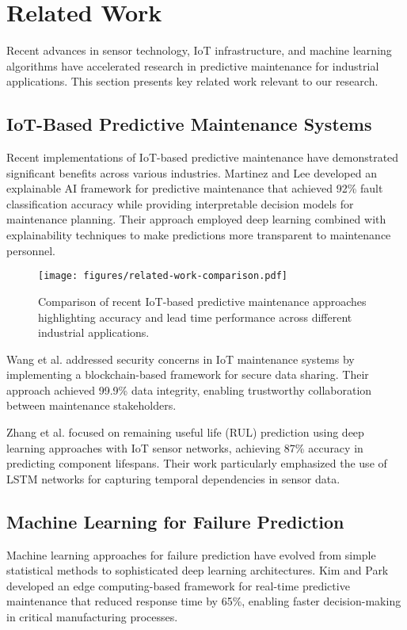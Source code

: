 \section{Related Work}
Recent advances in sensor technology, IoT infrastructure, and machine learning algorithms have accelerated research in predictive maintenance for industrial applications. This section presents key related work relevant to our research.

\subsection{IoT-Based Predictive Maintenance Systems}
Recent implementations of IoT-based predictive maintenance have demonstrated significant benefits across various industries. Martinez and Lee \cite{martinez2024} developed an explainable AI framework for predictive maintenance that achieved 92\% fault classification accuracy while providing interpretable decision models for maintenance planning. Their approach employed deep learning combined with explainability techniques to make predictions more transparent to maintenance personnel.

\begin{figure}[t]
\centering
\texttt{[image: figures/related-work-comparison.pdf]}
\caption{Comparison of recent IoT-based predictive maintenance approaches highlighting accuracy and lead time performance across different industrial applications.}
\label{fig:related_work}
\end{figure}

Wang et al. \cite{wang2024} addressed security concerns in IoT maintenance systems by implementing a blockchain-based framework for secure data sharing. Their approach achieved 99.9\% data integrity, enabling trustworthy collaboration between maintenance stakeholders.

Zhang et al. \cite{zhang2023} focused on remaining useful life (RUL) prediction using deep learning approaches with IoT sensor networks, achieving 87\% accuracy in predicting component lifespans. Their work particularly emphasized the use of LSTM networks for capturing temporal dependencies in sensor data.

\subsection{Machine Learning for Failure Prediction}
Machine learning approaches for failure prediction have evolved from simple statistical methods to sophisticated deep learning architectures. Kim and Park \cite{kim2023} developed an edge computing-based framework for real-time predictive maintenance that reduced response time by 65\%, enabling faster decision-making in critical manufacturing processes.

